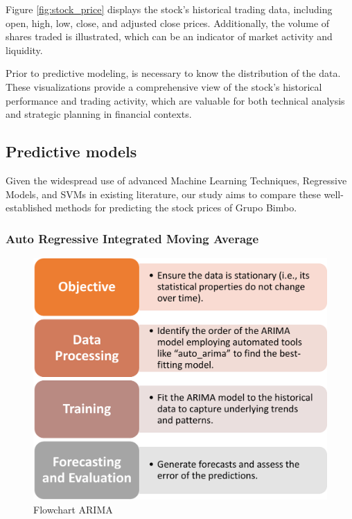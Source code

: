 \documentclass[conference]{IEEEtran}
\begin{document}
Figure \ref{fig:stock_price} displays the stock's historical trading data, including open, high, low, close, and adjusted close prices. Additionally, the volume of shares traded is illustrated, which can be an indicator of market activity and liquidity.

Prior to predictive modeling, is necessary to know the distribution of the data. These visualizations provide a comprehensive view of the stock's historical performance and trading activity, which are valuable for both technical analysis and strategic planning in financial contexts.


\subsection{Predictive models}
Given the widespread use of advanced Machine Learning Techniques, Regressive Models, and SVMs in existing literature, our study aims to compare these well-established methods for predicting the stock prices of Grupo Bimbo.

\subsubsection{Auto Regressive Integrated Moving Average}

\begin{figure}
    \centering
    \includegraphics[scale=0.38]{flowARIMA.png}
    \caption{Flowchart ARIMA}
    \label{fig:enter-label}
\end{figure}
\end{document}
